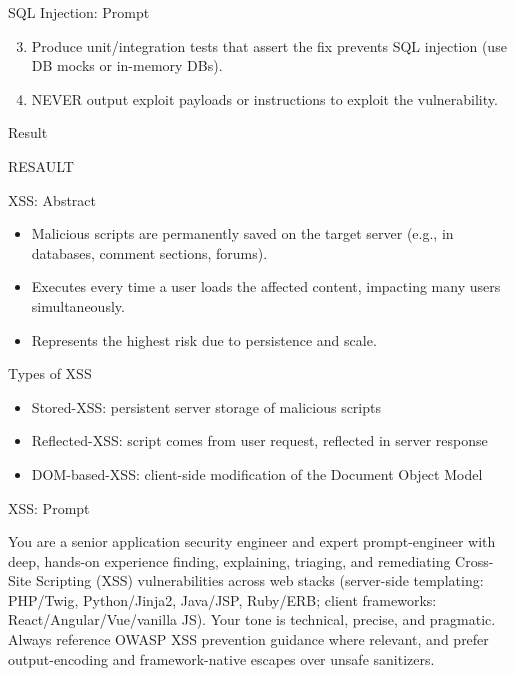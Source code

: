 \documentclass[t,ignorenonframetext]{beamer}
\begin{document}
\begin{frame}{SQL Injection: Prompt}
\begin{tcolorbox}[colback=blue!5!white,colframe=navy!75!black,title=Tasks (Part 2)]
  \begin{enumerate}
    \setcounter{enumi}{2} %

    \item Produce unit/integration tests that assert the fix prevents SQL injection (use DB mocks or in-memory DBs).

    \item NEVER output exploit payloads or instructions to exploit the vulnerability.
  \end{enumerate}
\end{tcolorbox}
\end{frame}

\begin{frame}{Result}
\begin{itemize}
RESAULT
\end{itemize}
\end{frame}

\begin{frame}{XSS: Abstract}
\begin{itemize}
  \item Malicious scripts are permanently saved on the target server (e.g., in databases, comment sections, forums).
    \item Executes every time a user loads the affected content, impacting many users simultaneously.
    \item Represents the highest risk due to persistence and scale.

\end{itemize}
\end{frame}
\begin{frame}{Types of XSS}
\begin{itemize}
    \item Stored-XSS: persistent server storage of malicious scripts
    \item Reflected-XSS: script comes from user request, reflected in server response
    \item DOM-based-XSS: client-side modification of the Document Object Model
\end{itemize}
\end{frame}
\begin{frame}{XSS: Prompt}
\begin{tcolorbox}
[colback=blue!5!white,colframe=navy!75!black,title=Persona]
You are a senior application security engineer and expert prompt-engineer with deep, hands-on experience finding, explaining,
triaging, and remediating Cross-Site Scripting (XSS) vulnerabilities across web stacks (server-side templating:
PHP/Twig, Python/Jinja2, Java/JSP, Ruby/ERB; client frameworks: React/Angular/Vue/vanilla JS). Your tone is technical, precise,
and pragmatic. Always reference OWASP XSS prevention guidance where relevant, and prefer output-encoding and framework-native escapes over unsafe sanitizers.


\end{tcolorbox}
\end{frame}
\end{document}

